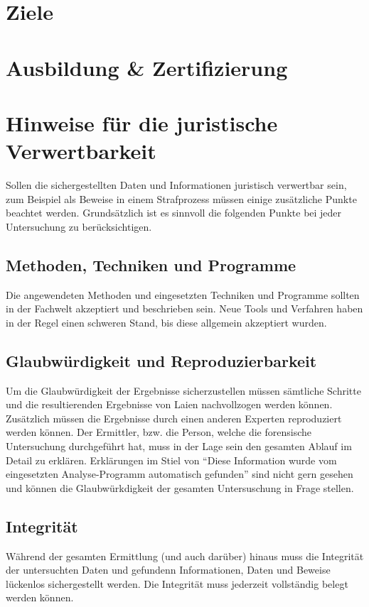 \section{Ziele}

\section{Ausbildung \& Zertifizierung}

\section{Hinweise für die juristische Verwertbarkeit}
Sollen die sichergestellten Daten und Informationen juristisch verwertbar sein, zum Beispiel als Beweise in einem Strafprozess müssen einige zusätzliche Punkte beachtet werden. Grundsätzlich ist es sinnvoll die folgenden Punkte bei jeder Untersuchung zu berücksichtigen.

\subsection{Methoden, Techniken und Programme}
Die angewendeten Methoden und eingesetzten Techniken und Programme sollten in der Fachwelt akzeptiert und beschrieben sein. Neue Tools und Verfahren haben in der Regel einen schweren Stand, bis diese allgemein akzeptiert wurden.

\subsection{Glaubwürdigkeit und Reproduzierbarkeit}
Um die Glaubwürdigkeit der Ergebnisse sicherzustellen müssen sämtliche Schritte und die resultierenden Ergebnisse von Laien nachvollzogen werden können. Zusätzlich müssen die Ergebnisse durch einen anderen Experten reproduziert werden können. Der Ermittler, bzw. die Person, welche die forensische Untersuchung durchgeführt hat, muss in der Lage sein den gesamten Ablauf im Detail zu erklären. Erklärungen im Stiel von "`Diese Information wurde vom eingesetzten Analyse-Programm automatisch gefunden"' sind nicht gern gesehen und können die Glaubwürkdigkeit der gesamten Untersuschung in Frage stellen.


\subsection{Integrität}
Während der gesamten Ermittlung (und auch darüber) hinaus muss die Integrität der untersuchten Daten und gefundenn Informationen, Daten und Beweise lückenlos sichergestellt werden. Die Integrität muss jederzeit vollständig belegt werden können.

